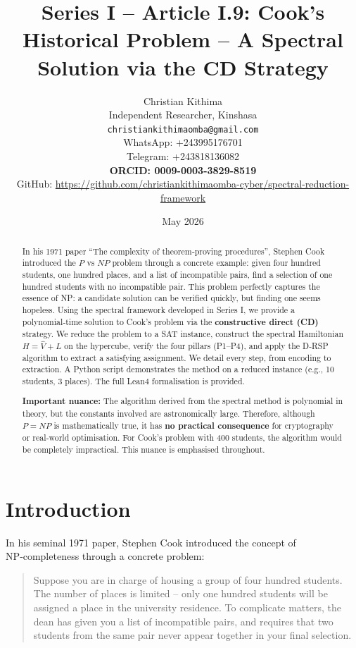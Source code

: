 \documentclass[11pt,a4paper]{article}
\title{Series I – Article I.9: Cook's Historical Problem – A Spectral Solution via the CD Strategy}
\author{Christian Kithima \\
Independent Researcher, Kinshasa \\
\texttt{christiankithimaomba@gmail.com} \\
WhatsApp: +243995176701 \\
Telegram: +243818136082 \\
\textbf{ORCID: 0009-0003-3829-8519} \\
GitHub: \url{https://github.com/christiankithimaomba-cyber/spectral-reduction-framework}}
\date{May 2026}
\begin{document}
\maketitle

\begin{abstract}
In his 1971 paper “The complexity of theorem‑proving procedures”, Stephen Cook introduced the \(P\) vs \(NP\) problem through a concrete example: given four hundred students, one hundred places, and a list of incompatible pairs, find a selection of one hundred students with no incompatible pair. This problem perfectly captures the essence of NP: a candidate solution can be verified quickly, but finding one seems hopeless. Using the spectral framework developed in Series I, we provide a polynomial‑time solution to Cook's problem via the \textbf{constructive direct (CD)} strategy. We reduce the problem to a SAT instance, construct the spectral Hamiltonian \(H = \hat{V} + L\) on the hypercube, verify the four pillars (P1–P4), and apply the D‑RSP algorithm to extract a satisfying assignment. We detail every step, from encoding to extraction. A Python script demonstrates the method on a reduced instance (e.g., 10 students, 3 places). The full Lean4 formalisation is provided.

\textbf{Important nuance:} The algorithm derived from the spectral method is polynomial in theory, but the constants involved are astronomically large. Therefore, although \(P = NP\) is mathematically true, it has \textbf{no practical consequence} for cryptography or real‑world optimisation. For Cook's problem with 400 students, the algorithm would be completely impractical. This nuance is emphasised throughout.
\end{abstract}

\tableofcontents

\section{Introduction}

In his seminal 1971 paper, Stephen Cook introduced the concept of NP‑completeness through a concrete problem:

\begin{quote}
Suppose you are in charge of housing a group of four hundred students. The number of places is limited – only one hundred students will be assigned a place in the university residence. To complicate matters, the dean has given you a list of incompatible pairs, and requires that two students from the same pair never appear together in your final selection.
\end{quote}
\end{document}
